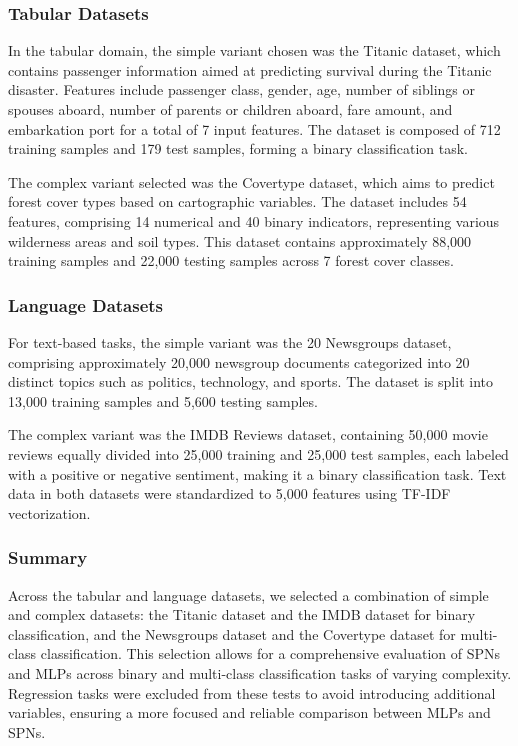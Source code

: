 \subsubsection{Tabular Datasets}
In the tabular domain, the simple variant chosen was the Titanic dataset, which contains passenger information aimed at predicting survival during the Titanic disaster. Features include passenger class, gender, age, number of siblings or spouses aboard, number of parents or children aboard, fare amount, and embarkation port for a total of 7 input features. The dataset is composed of 712 training samples and 179 test samples, forming a binary classification task.

The complex variant selected was the Covertype dataset, which aims to predict forest cover types based on cartographic variables. The dataset includes 54 features, comprising 14 numerical and 40 binary indicators, representing various wilderness areas and soil types. This dataset contains approximately 88,000 training samples and 22,000 testing samples across 7 forest cover classes.

\subsubsection{Language Datasets}
For text-based tasks, the simple variant was the 20 Newsgroups dataset, comprising approximately 20,000 newsgroup documents categorized into 20 distinct topics such as politics, technology, and sports. The dataset is split into 13,000 training samples and 5,600 testing samples. 

The complex variant was the IMDB Reviews dataset, containing 50,000 movie reviews equally divided into 25,000 training and 25,000 test samples, each labeled with a positive or negative sentiment, making it a binary classification task. Text data in both datasets were standardized to 5,000 features using TF-IDF vectorization.

\subsubsection{Summary}

Across the tabular and language datasets, we selected a combination of simple and complex datasets: the Titanic dataset and the IMDB dataset for binary classification, and the Newsgroups dataset and the Covertype dataset for multi-class classification. This selection allows for a comprehensive evaluation of SPNs and MLPs across binary and multi-class classification tasks of varying complexity. Regression tasks were excluded from these tests to avoid introducing additional variables, ensuring a more focused and reliable comparison between MLPs and SPNs.

